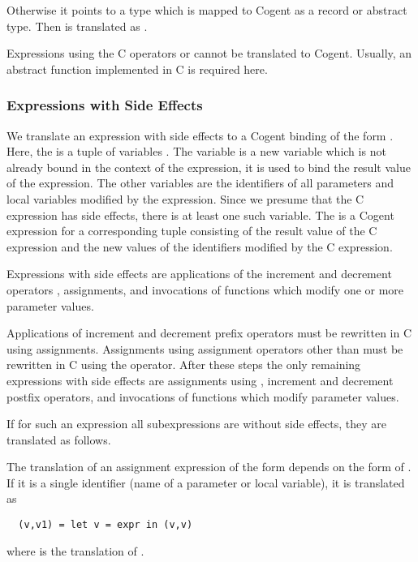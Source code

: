 Otherwise it points to a type which is mapped to Cogent as a record or abstract type. Then  is translated as . 

Expressions using the C operators  or  cannot be translated to Cogent. Usually, an abstract
function implemented in C is required here.

\subsubsection{Expressions with Side Effects}

We translate an expression with side effects to a Cogent binding of the form . Here, the
 is a tuple of variables . The variable  is a
new variable which is not already bound in the context of the expression, it is used to bind the result value of the
expression. The other variables are the identifiers of all parameters and local 
variables modified by the expression. Since we presume that the C expression has side effects, there is at least one
such variable.
The  is a Cogent expression for a corresponding tuple consisting of the result value of the C expression and the new values
of the identifiers modified by the C expression.

Expressions with side effects are applications of the increment and decrement operators \code{++,--}, assignments,
and invocations of functions which modify one or more parameter values.

Applications of increment and decrement prefix operators must be rewritten in C using assignments. Assignments using assignment
operators other than \code{=} must be rewritten in C using the \code{=} operator. After these steps the only 
remaining expressions with side effects are assignments using \code{=}, increment and decrement postfix operators, 
and invocations of functions which modify parameter values.

If for such an expression all subexpressions are without side effects, they are translated as follows. 

The translation of an assignment expression of the form  depends on the form of . If it is
a single identifier  (name of a parameter or local variable), it is translated as
\begin{verbatim}
  (v,v1) = let v = expr in (v,v)
\end{verbatim}
where  is the translation of .


